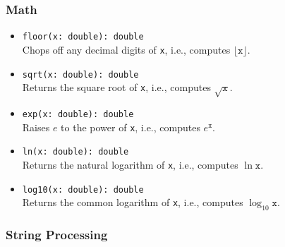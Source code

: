\documentclass[10pt,landscape]{article}
\begin{document}
\begin{multicols*}{2}
\subsubsection*{Math}

\begin{itemize}
  \item \verb|floor(x: double): double|\\
    Chops off any decimal digits of \texttt{x},
    i.e., computes $\lfloor\mathtt{x}\rfloor$.
  \item \verb|sqrt(x: double): double|\\
    Returns the square root of \texttt{x}, i.e., computes $\sqrt{\mathtt{x}}$.
  \item \verb|exp(x: double): double|\\
    Raises $e$ to the power of \texttt{x}, i.e., computes $e^\mathtt{x}$.
  \item \verb|ln(x: double): double|\\
    Returns the natural logarithm of \texttt{x},
    i.e., computes $\ln \mathtt{x}$.
  \item \verb|log10(x: double): double|\\
    Returns the common logarithm of \texttt{x},
    i.e., computes $\log_{10} \mathtt{x}$.
\end{itemize}

\subsubsection*{String Processing}


\end{multicols*}
\end{document}
